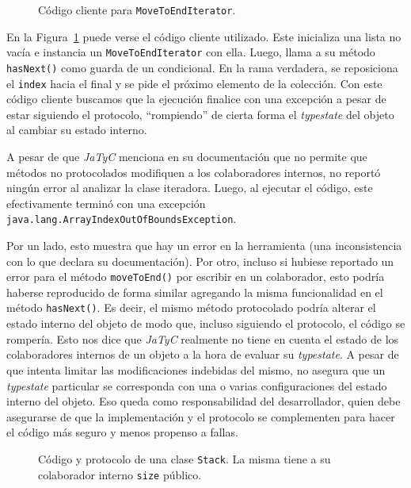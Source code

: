 \begin{figure}[htbp]
    \centering
    
    \caption{Código cliente para \texttt{MoveToEndIterator}.}
    \label{exp:state-equals-typestate:client}
\end{figure}

En la Figura~\ref{exp:state-equals-typestate:client} puede verse el código cliente utilizado. Este inicializa una lista no vacía e instancia un \texttt{MoveToEndIterator} con ella. Luego, llama a su método \texttt{hasNext()} como guarda de un condicional. En la rama verdadera, se reposiciona el \texttt{index} hacia el final y se pide el próximo elemento de la colección. Con este código cliente buscamos que la ejecución finalice con una excepción a pesar de estar siguiendo el protocolo, ``rompiendo'' de cierta forma el \textit{typestate} del objeto al cambiar su estado interno.

A pesar de que \textit{JaTyC} menciona en su documentación que no permite que métodos no protocolados modifiquen a los colaboradores internos, no reportó ningún error al analizar la clase iteradora. Luego, al ejecutar el código, este efectivamente terminó con una excepción \texttt{java.lang.ArrayIndexOutOfBoundsException}.

Por un lado, esto muestra que hay un error en la herramienta (una inconsistencia con lo que declara su documentación). Por otro, incluso si hubiese reportado un error para el método \texttt{moveToEnd()} por escribir en un colaborador, esto podría haberse reproducido de forma similar agregando la misma funcionalidad en el método \texttt{hasNext()}. Es decir, el mismo método protocolado podría alterar el estado interno del objeto de modo que, incluso siguiendo el protocolo, el código se rompería. Esto nos dice que \textit{JaTyC} realmente no tiene en cuenta el estado de los colaboradores internos de un objeto a la hora de evaluar su \textit{typestate}. A pesar de que intenta limitar las modificaciones indebidas del mismo, no asegura que un \textit{typestate} particular se corresponda con una o varias configuraciones del estado interno del objeto. Eso queda como responsabilidad del desarrollador, quien debe asegurarse de que la implementación y el protocolo se complementen para hacer el código más seguro y menos propenso a fallas.

\begin{figure}[htbp]
\centering
\begin{minipage}[t]{0.48\textwidth}
        
\end{minipage}
\hfill
\begin{minipage}[t]{0.48\textwidth}
    
\end{minipage}
\caption{Código y protocolo de una clase \texttt{Stack}. La misma tiene a su colaborador interno \texttt{size} público.}
\label{exp:public-stack:stack}
\end{figure}

